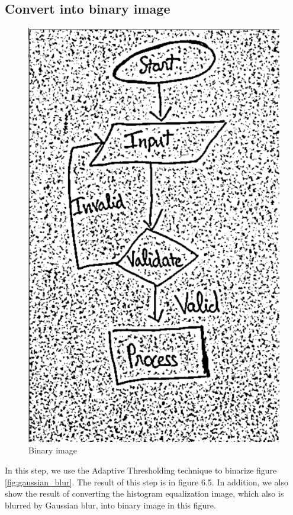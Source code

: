 \subsection{Convert into binary image}
\begin{figure}[t]
\centering
    \includegraphics[scale=0.35]{Images/Preprocessing/binaryimage.png}
    \caption{Binary image}
    \label{fig: binary_image}
\end{figure}

In this step, we use the Adaptive Thresholding technique to binarize figure \ref{fig:gaussian_blur}. The result of this step is in figure 6.5. In addition, we also show the result of converting the histogram equalization image, which also is blurred by Gaussian blur, into binary image in this figure. \\


